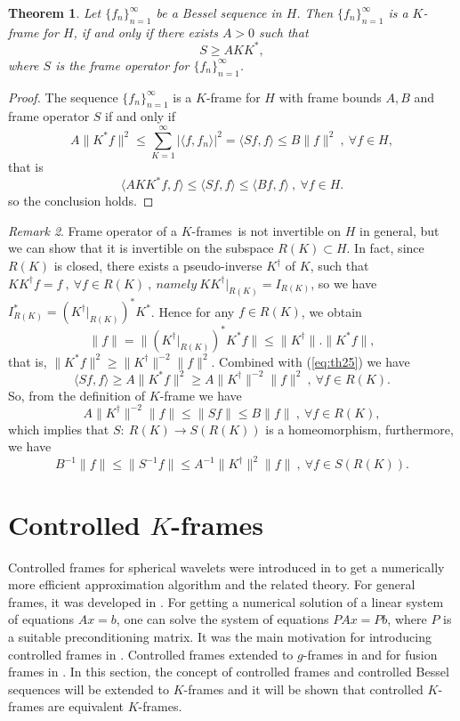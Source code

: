 \documentclass[11pt]{amsart}
\newtheorem{thm}{Theorem}[section]
\theoremstyle{definition}
\theoremstyle{remark}
\newtheorem{rem}[thm]{Remark}
\numberwithin{equation}{section}
\begin{document}
\begin{thm}
Let $\{f_n\}_{n=1}^\infty$ be a Bessel sequence in $H$. Then $\{f_n\}_{n=1}^\infty$ is a $K$-frame for $H$, if and only if there exists $A>0$ such that \[S\ge AKK^*,\] where $S$ is the frame operator for $\{f_n\}_{n=1}^\infty$.
\end{thm}
\begin{proof} The sequence
$\{f_n\}_{n=1}^\infty$ is a $K$-frame for $H$ with frame bounds $A, B$ and frame operator $S$ if and only if
\begin{equation}\label{eq:th25}
A\|K^*f\|^2\le\sum_{K=1}^{\infty}|\langle f,f_n\rangle |^2=\langle Sf,f\rangle\le B\|f\|^2\ ,~\forall f\in H,
\end{equation}
that is
\[\langle AKK^*f,f\rangle\le\langle Sf,f\rangle\le \langle Bf,f\rangle\ ,~\forall f\in H.\]
so the conclusion holds.
\end{proof}
\begin{rem}
Frame operator of a {$K$-frames}\ is not invertible on $H$ in general, but we can show that it is invertible on the subspace $R(K)\subset H$. In fact, since $R(K)$ is closed, there exists a pseudo-inverse $K^\dagger$ of $K$, such that
$KK^\dagger f=f\ ,~\forall f\in R(K)\ ,~namely\  KK^\dagger|_{R(K)}=I_{R(K)}$, so we have $I_{R(K)}^*=(K^\dagger|_{R(K)})^*K^*$. Hence for any $f\in R(K)$, we obtain
\[\|f\|=\|(K^\dagger|_{R(K)})^*K^*f\|\le\|K^\dagger\|.\|K^*f\|,\]
that is, $\|K^*f\|^2\ge \|K^\dagger\|^{-2}\|f\|^2$. Combined with (\ref{eq:th25}) we have
\begin{equation}
\langle Sf,f\rangle\ge A\|K^*f\|^2\ge A\|K^\dagger\|^{-2}\|f\|^2\ ,~\forall f\in R(K).
\end{equation}
So, from the definition of $K$-frame we have
\begin{equation}
A\|K^\dagger\|^{-2}\|f\|\le\|Sf\|\le B\|f\|\ ,~\forall f\in R(K),
\end{equation}
which implies that $S:\ R(K)\to S(R(K))$ is a homeomorphism, furthermore, we have
\[B^{-1}\|f\|\le \|S^{-1}f\|\le A^{-1}\|K^\dagger\|^2\|f\|\ ,~\forall f\in S(R(K)).\]
\end{rem}

\section{Controlled $K$-frames}
Controlled frames for spherical wavelets were introduced in \cite{Bogdanova} to get a numerically
more efficient approximation algorithm and the related theory. For general frames, it was
developed in \cite{Balazs}. For getting a numerical solution of a linear system of equations $Ax = b$,
one can solve the system of equations $PAx = Pb$, where $P$ is a suitable preconditioning
matrix. It was the main motivation for introducing controlled frames in \cite{Bogdanova}. Controlled frames extended to $g$-frames in \cite{Rahimi} and for fusion frames in \cite{khos}.
In this section, the concept of controlled frames and controlled Bessel sequences will be extended to $K$-frames and it will be shown  that controlled $K$-frames are equivalent $K$-frames.
\end{document}
